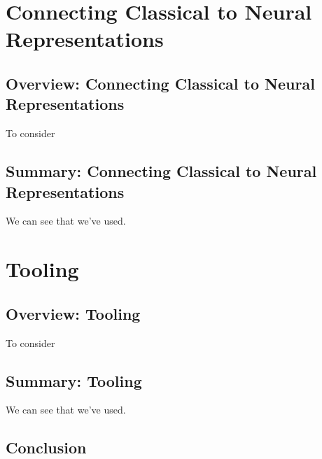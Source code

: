 \documentclass{book}
\begin{document}
\part{Connecting Classical to Neural Representations}

\chapter{Overview: Connecting Classical to Neural Representations}
To consider






\chapter{Summary: Connecting Classical to Neural Representations}
We can see that we've used.


\part{Tooling}

\chapter{Overview: Tooling}
To consider



\chapter{Summary: Tooling}
We can see that we've used.

\chapter*{Conclusion}
\end{document}
